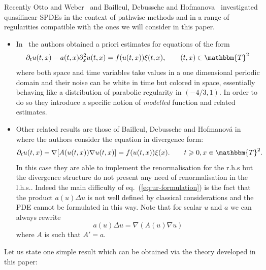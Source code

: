 \documentclass[11pt,reqno]{amsart}
\newcommand{\tmtextit}[1]{{\itshape{#1}}}
\newenvironment{itemizedot}{\begin{itemize} \renewcommand{\labelitemi}{$\bullet$}\renewcommand{\labelitemii}{$\bullet$}\renewcommand{\labelitemiii}{$\bullet$}\renewcommand{\labelitemiv}{$\bullet$}}{\end{itemize}}
\begin{document}
Recently Otto and Weber~{\cite{otto_quasilinear_2016}} and Bailleul, Debussche
and Hofmanova~{\cite{hofmanova}} investigated quasilinear SPDEs in the context
of pathwise methods and in a range of regularities compatible with the ones we
will consider in this paper.
\begin{itemizedot}
  \item In~{\cite{otto_quasilinear_2016}} the authors obtained a priori
  estimates for equations of the form
  \[ \partial_t u (t, x) - a (t, x) \partial_x^2 u (t, x) = f (u (t, x)) \xi
     (t, x), \qquad (t, x) \in \mathbbm{T}^2 \]
  where both space and time variables take values in a one dimensional
  periodic domain and their noise can be white in time but colored in space,
  essentially behaving like a distribution of parabolic regularity in $(- 4 /
  3, 1)$. In order to do so they introduce a specific notion of
  \tmtextit{modelled} function and related estimates. \ \ \ \
  
  \item Other related results are those of Bailleul, Debussche and
  Hofmanov{\'a} in~{\cite{hofmanova}} where the authors consider the equation
  in divergence form:
  \begin{equation}
    \partial_t u (t, x) - \nabla [A (u (t, x)) \nabla u (t, x)] = f (u (t, x))
    \xi (x) . \label{eq:deb-hof} \qquad t \geqslant 0, x \in \mathbbm{T}^2 .
  \end{equation}
  In this case they are able to implement the renormalisation for the r.h.s
  but the divergence structure do not present any need of renormalisation in
  the l.h.s.. Indeed the main difficulty of eq.~(\ref{eq:ur-formulation}) is
  the fact that the product $a (u) \Delta u$ is not well defined by classical
  considerations and the PDE cannot be formulated in this way. Note that for
  scalar $u$ and $a$ we can always rewrite
  \[ a (u) \Delta u = \nabla (A (u) \nabla u) \]
  where $A$ is such that $A' = a$.
\end{itemizedot}
Let us state one simple result which can be obtained via the theory developed
in this paper:
\end{document}
